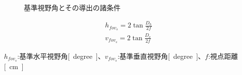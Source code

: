 \begin{figure}[h]
  \begin{center}
  \caption{基準視野角とその導出の諸条件}
  \label{taikan:kijuntods}
\end{center}
\end{figure}

\begin{align}
    h_{fov_s} = 2\tan{\frac{D_h}{2f}} \label{taikan:eq:kijun1}\\
    v_{fov_s} = 2\tan{\frac{D_v}{2f}} \label{taikan:eq:kijun2}
\end{align}

$h_{fov_s}$:基準水平視野角\si{[degree]}、$v_{fov_s}$:基準垂直視野角\si{[degree]}、$f$:視点距離\si{[cm]}

